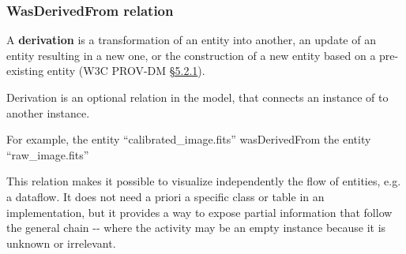 \subsubsection{WasDerivedFrom relation}

A \textbf{derivation} is a transformation of an entity into another, an update of an entity resulting in a new one, or the construction of a new entity based on a pre-existing entity (W3C PROV-DM \href{https://www.w3.org/TR/prov-dm/#term-Derivation}{\S5.2.1}).

Derivation is an optional relation  in the model, that connects an instance of  to another instance.

For example, the entity ``calibrated\_image.fits'' wasDerivedFrom the entity ``raw\_image.fits''

This relation makes it possible to visualize independently the flow of entities, e.g. a dataflow. It does not need a priori a specific class or table in an implementation, but it provides a way to expose partial information that follow the general chain -- where the activity may be an empty instance because it is unknown or irrelevant.




